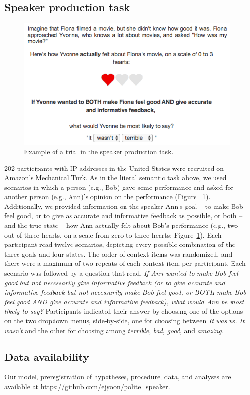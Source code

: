\documentclass[9pt,twocolumn,twoside,lineno]{main_class_file}
\begin{document}
{\subsection*{Speaker production task}\label{speaker-production-task}

\begin{figure}[!h]
\includegraphics[width=\columnwidth]{fig/screenshot}
\caption{Example of a trial in the speaker production task.}\label{fig:screenshot}
\end{figure}

202 participants with IP addresses in the United States were recruited
on Amazon's Mechanical Turk. As in the literal semantic task above, we
used scenarios in which a person (e.g., Bob) gave some performance and
asked for another person (e.g., Ann)'s opinion on the performance
(Figure ~\ref{fig:screenshot}). Additionally, we provided information on
the speaker Ann's goal -- to make Bob feel good, or to give as accurate
and informative feedback as possible, or both -- and the true state --
how Ann actually felt about Bob's performance (e.g., two out of three
hearts, on a scale from zero to three hearts;
Figure~\ref{fig:screenshot}). Each participant read twelve scenarios,
depicting every possible combination of the three goals and four states.
The order of context items was randomized, and there were a maximum of
two repeats of each context item per participant. Each scenario was
followed by a question that read, \emph{If Ann wanted to make Bob
feel good but not necessarily give informative feedback (or to give
accurate and informative feedback but not necessarily make Bob feel
good, or BOTH make Bob feel good AND give accurate and informative
feedback), what would Ann be most likely to say?} Participants indicated
their answer by choosing one of the options on the two dropdown menus,
side-by-side, one for choosing between \emph{It was} vs. \emph{It
wasn't} and the other for choosing among \emph{terrible}, \emph{bad},
\emph{good}, and \emph{amazing.}

\subsection*{Data availability}\label{data-availability}

Our model, preregistration of hypotheses, procedure, data, and analyses
are available at \url{https://github.com/ejyoon/polite_speaker}.

}
\end{document}
